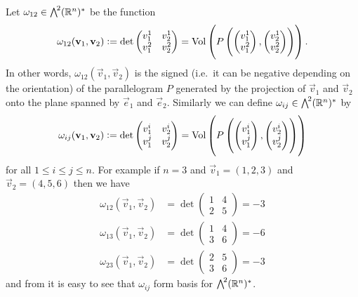 \documentclass[11pt,a4paper]{article}
\begin{document}
\begin{example}
  Let $\omega_{12} \in \bigwedge^{\!2}(\mathbb{R}^n)^*$ be the function
  \[
    \omega_{12}(\vec v_1, \vec v_2) :=
    \det
    \begin{pmatrix}
      v_1^1 & v_2^1 \\
      v_1^2 & v_2^2 \\
    \end{pmatrix} =
    \Vol \del{P\del{
      \begin{pmatrix}
        v_1^1 \\ v_1^2
      \end{pmatrix},
      \begin{pmatrix}
        v_2^1 \\ v_2^2
      \end{pmatrix}
  }}.
  \]
  In other words, $\omega_{12}(\vec v_1, \vec v_2)$ is
  the signed (i.e.\ it can be negative depending on the orientation)
  of the parallelogram $P$ generated by the projection of $\vec v_1$
  and $\vec v_2$ onto the plane spanned by $\vec e_1$ and $\vec e_2$.
  Similarly we can define $\omega_{ij} \in \bigwedge^{\!2}(\mathbb{R}^n)^*$ by
  \[
    \omega_{ij}(\vec v_1, \vec v_2) :=
    \det
    \begin{pmatrix}
      v_1^i & v_2^i \\
      v_1^j & v_2^j \\
    \end{pmatrix} =
    \Vol \del{P\del{
      \begin{pmatrix}
        v_1^i \\ v_1^j
      \end{pmatrix},
      \begin{pmatrix}
        v_2^i \\ v_2^j
      \end{pmatrix}
  }}
  \]
  for all $1 \le i \le j \le n$.
  For example if $n = 3$ and $\vec v_1 = (1,2,3)$ and
  $\vec v_2 = (4,5,6)$ then we have
  \begin{align*}
    \omega_{12}(\vec v_1, \vec v_2) &=
    \det
    \begin{pmatrix}
      1 & 4 \\
      2 & 5
    \end{pmatrix} = -3 \\
    \omega_{13}(\vec v_1, \vec v_2) &=
    \det
    \begin{pmatrix}
      1 & 4 \\
      3 & 6
    \end{pmatrix} = -6 \\
    \omega_{23}(\vec v_1, \vec v_2) &=
    \det
    \begin{pmatrix}
      2 & 5 \\
      3 & 6
    \end{pmatrix} = -3
  \end{align*}
  and from  it is easy to see
  that $\omega_{ij}$ form basis for $\bigwedge^{\!2}(\mathbb{R}^n)^*$.
\end{example}
\end{document}
